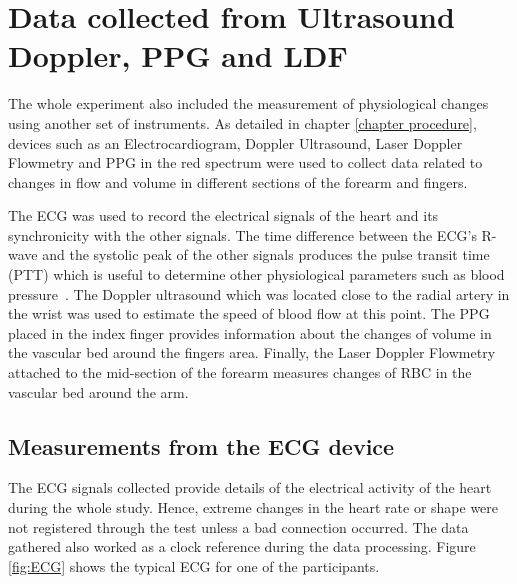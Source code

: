
\chapter{Data collected from Ultrasound Doppler, PPG and LDF}  %

\ifpdf
\graphicspath{{Chapter9/Figs/Raster/}{Chapter9/Figs/PDF/}{Chapter9/Figs/}}
\else
\graphicspath{{Chapter9/Figs/Vector/}{Chapter9/Figs/}}
\fi

The whole experiment also included the measurement of physiological changes using another set of instruments. As detailed in chapter \ref{chapter procedure}, devices such as an Electrocardiogram, Doppler Ultrasound, Laser Doppler Flowmetry and PPG in the red spectrum were used to collect data related to changes in flow and volume in different sections of the forearm and fingers. 

The ECG was used to record the electrical signals of the heart and its synchronicity with the other signals. The time difference between the ECG's R-wave and the systolic peak of the other signals produces the pulse transit time (PTT) which is useful to determine other physiological parameters such as blood pressure~\cite{liu2017cuffless}. The Doppler ultrasound which was located close to the radial artery in the wrist was used to estimate the speed of blood flow at this point. The PPG placed in the index finger provides information about the changes of volume in the vascular bed around the fingers area. Finally, the Laser Doppler Flowmetry attached to the mid-section of the forearm measures changes of RBC in the vascular bed around the arm. 

\section{Measurements from the ECG device}
\label{section comparison 1}
The ECG signals collected provide details of the electrical activity of the heart during the whole study. Hence, extreme changes in the heart rate or shape were not registered through the test unless a bad connection occurred. The data gathered also worked as a clock reference during the data processing. Figure \ref{fig:ECG} shows the typical ECG for one of the participants.

